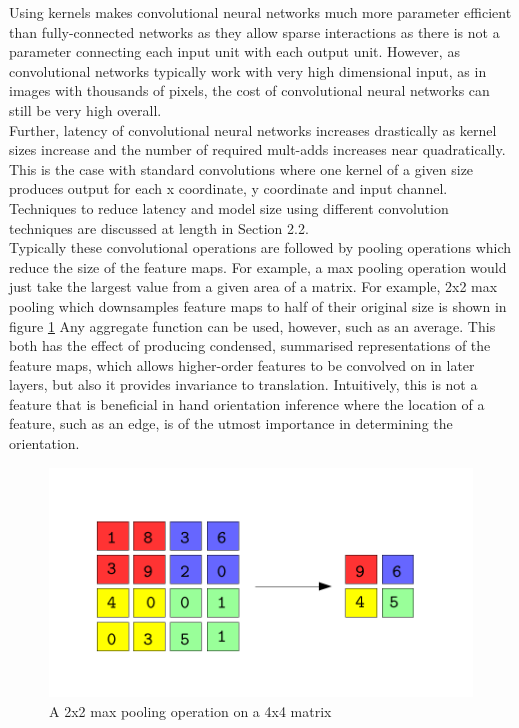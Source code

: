 \documentclass{article}
\begin{document}
Using kernels makes convolutional neural networks much more parameter efficient than fully-connected networks as they allow sparse interactions as there is not a parameter connecting each input unit with each output unit. However, as convolutional networks typically work with very high dimensional input, as in images with thousands of pixels, the cost of convolutional neural networks can still be very high overall. \\

Further, latency of convolutional neural networks increases drastically as kernel sizes increase and the number of required mult-adds increases near quadratically. This is the case with standard convolutions where one kernel of a given size produces output for each x coordinate, y coordinate and input channel. Techniques to reduce latency and model size using different convolution techniques are discussed at length in Section 2.2. \\

Typically these convolutional operations are followed by pooling operations which reduce the size of the feature maps. For example, a max pooling operation would just take the largest value from a given area of a matrix. For example, 2x2 max pooling which downsamples feature maps to half of their original size is shown in figure \ref{fig:maxpool} Any aggregate function can be used, however, such as an average. This both has the effect of producing condensed, summarised representations of the feature maps, which allows higher-order features to be convolved on in later layers, but also it provides invariance to translation. Intuitively, this is not a feature that is beneficial in hand orientation inference where the location of a feature, such as an edge, is of the utmost importance in determining the orientation. \\


\begin{figure}
  \includegraphics[width=\linewidth]{maxpool.pdf}
  \caption{A 2x2 max pooling operation on a 4x4 matrix}
  \label{fig:maxpool}
\end{figure}
\end{document}
